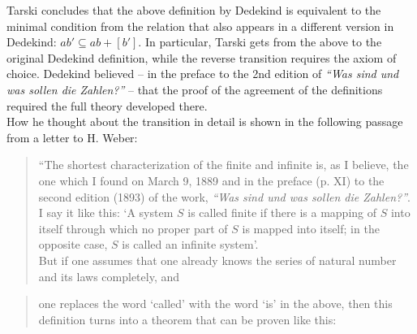 \documentclass[leqno,hidelinks]{article}
\theoremstyle{definition}
\newcommand{\partof}{\subseteq}
\begin{document}
\begin{paracol}{2}
Tarski concludes that the above definition by Dedekind is equivalent to the
minimal condition from the relation that also appears in a different version in
Dedekind: $ab' \partof ab+[b']$. In particular, Tarski gets from the above to
the original Dedekind definition, while the reverse transition requires the axiom
of choice. Dedekind believed -- in the preface to the 2nd edition of
\emph{``Was sind und was sollen die Zahlen?''} -- that the proof of the agreement
of the definitions required the full theory developed there.
\ \\

How he thought about the transition in detail is shown in the following passage
from a letter to H. Weber:

\begin{quote}
``The shortest characterization of the finite and infinite is, as I believe, the
one which I found on March 9, 1889 and in the preface (p. XI) to the second edition
(1893) of the work, \emph{``Was sind und was sollen die Zahlen?''}. I say it like
this: `A system $S$ is called finite if there is a mapping of $S$ into itself
through which no proper part of $S$ is mapped into itself; in the opposite case,
$S$ is called an infinite system'.
\ \\

\hspace{12pt} But if one assumes that one already knows the series of natural
number and its laws completely, and

\end{quote}

\newpage

\begin{quote}
one replaces the word `called' with the word `is' in the above, then this definition
turns into a theorem that can be proven like this:


\end{quote}
\end{paracol}
\end{document}
